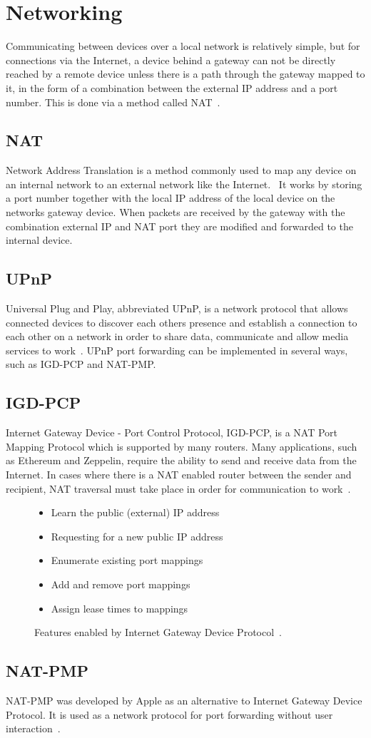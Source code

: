 \section{Networking}
Communicating between devices over a local network is relatively simple, but for connections via the Internet, a device behind a gateway can not be directly reached by a remote device unless there is a path through the gateway mapped to it, in the form of a combination between the external IP address and a port number. This is done via a method called NAT~\cite{kurose:p349}. 

\subsection{NAT}
Network Address Translation is a method commonly used to map any device on an internal network to an external network like the Internet.~\cite{kurose:p349} It works by storing a port number together with the local IP address of the local device on the networks gateway device. When packets are received by the gateway with the combination external IP and NAT port they are modified and forwarded to the internal device.

\subsection{UPnP}
Universal Plug and Play, abbreviated UPnP, is a network protocol that allows connected devices to discover each others presence and establish a connection to each other on a network in order to share data, communicate and allow media services to work~\cite{kurose:p352}. UPnP port forwarding can be implemented in several ways, such as IGD-PCP and NAT-PMP. 

\subsection{IGD-PCP}
Internet Gateway Device - Port Control Protocol, IGD-PCP, is a NAT Port Mapping Protocol which is supported by many routers. Many applications, such as Ethereum and Zeppelin, require the ability to send and receive data from the Internet. In cases where there is a NAT enabled router between the sender and recipient, NAT traversal must take place in order for communication to work~\cite{igd-pcp:rfc}.

\begin{figure}
\centering
\begin{itemize}
    \item Learn the public (external) IP address
    \item Requesting for a new public IP address
    \item Enumerate existing port mappings
    \item Add and remove port mappings
    \item Assign lease times to mappings
\end{itemize}
\caption{Features enabled by Internet Gateway Device Protocol~\cite{igd-pcp:rfc}.}
\label{fig:igd}
\end{figure}

\subsection{NAT-PMP}
NAT-PMP was developed by Apple as an alternative to Internet Gateway Device Protocol. It is used as a network protocol for port forwarding without user interaction~\cite{nat-pmp:rfc}.